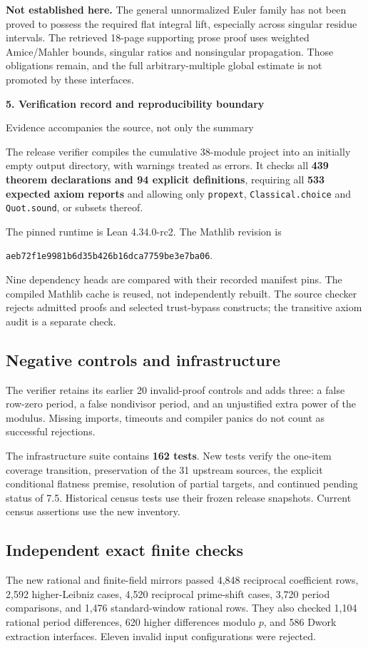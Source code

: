 \documentclass[11pt]{article}
\newcommand{\pageheading}[2]{{\Large\bfseries\color{ink}#1}\par{\small #2}\par\medskip}
\begin{document}
\textbf{Not established here.} The general unnormalized Euler family has not been proved to possess the required flat integral lift, especially across singular residue intervals. The retrieved 18-page supporting prose proof uses weighted Amice/Mahler bounds, singular ratios and nonsingular propagation. Those obligations remain, and the full arbitrary-multiple global estimate is not promoted by these interfaces.

\newpage
\pageheading{5. Verification record and reproducibility boundary}{Evidence accompanies the source, not only the summary}
The release verifier compiles the cumulative 38-module project into an initially empty output directory, with warnings treated as errors. It checks all \textbf{439 theorem declarations and 94 explicit definitions}, requiring all \textbf{533 expected axiom reports} and allowing only \texttt{propext}, \texttt{Classical.choice} and \texttt{Quot.sound}, or subsets thereof.

The pinned runtime is Lean 4.34.0-rc2. The Mathlib revision is
\begin{center}\footnotesize\texttt{aeb72f1e9981b6d35b426b16dca7759be3e7ba06}.\end{center}
Nine dependency heads are compared with their recorded manifest pins. The compiled Mathlib cache is reused, not independently rebuilt. The source checker rejects admitted proofs and selected trust-bypass constructs; the transitive axiom audit is a separate check.

\subsection*{Negative controls and infrastructure}
The verifier retains its earlier 20 invalid-proof controls and adds three: a false row-zero period, a false nondivisor period, and an unjustified extra power of the modulus. Missing imports, timeouts and compiler panics do not count as successful rejections.

The infrastructure suite contains \textbf{162 tests}. New tests verify the one-item coverage transition, preservation of the 31 upstream sources, the explicit conditional flatness premise, resolution of partial targets, and continued pending status of 7.5. Historical census tests use their frozen release snapshots. Current census assertions use the new inventory.

\subsection*{Independent exact finite checks}
The new rational and finite-field mirrors passed 4,848 reciprocal coefficient rows, 2,592 higher-Leibniz cases, 4,520 reciprocal prime-shift cases, 3,720 period comparisons, and 1,476 standard-window rational rows. They also checked 1,104 rational period differences, 620 higher differences modulo $p$, and 586 Dwork extraction interfaces. Eleven invalid input configurations were rejected.
\end{document}
